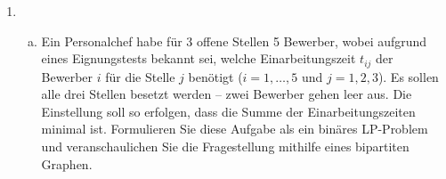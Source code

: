 \documentclass[11pt, a4paper]{article}
\begin{document}
\begin{enumerate}[\bfseries A:]
\begin{enumerate}[\bfseries 1.]
\begin{enumerate}[a)]
	\begin{center}
		\begin{pspicture}(-0.5,-1)(3.25,3)
		\footnotesize
		
		\cnode*(0,1){3pt}{V0} [180](0,1){$v_0$}
		\cnode*(1,2){3pt}{V1} [315](1,2){$v_1$}
		\cnode*(1,1){3pt}{V2} [225](1,1){$v_2$}
		\cnode*(1,0){3pt}{V3} [ 45](1,0){$v_3$}
		\cnode*(2,1){3pt}{V4} [270](2,1){$v_4$}
		\cnode*(3,0){3pt}{V5} [270](3,0){$v_5$}
		\cnode*(3,2){3pt}{V6} [ 90](3,2){$v_6$}
		
		 [135](0.5, 1.5){$3 \mid 3$}
		 [ 90](0.5, 1.0){$4 \mid 4$}
		 [225](0.5, 0.5){$4 \mid 3$}
		 [270](2, -0.5){$4 \mid 3$}
		 [ 90](2,  2.5){$5 \mid 2$}
		 [  0](1.0, 1.5){$6 \mid 6$}
		 [ 90](2.0, 2.0){$1 \mid 3$}
		 [  0](1.0, 0.5){$1 \mid 6$}
		 [ 90](1.5, 1.0){$4 \mid 5$}
		 [270](2.0, 0.0){$2 \mid 5$}
		 [225](2.5, 0.5){$1 \mid 3$}
		 [135](2.5, 1.5){$7 \mid 4$}
		 [  0](3.0, 1.0){$4 \mid 2$}
		
		\normalsize
		\end{pspicture}
	\end{center}
	
	Gefragt ist nach einem kostenminimalen Fluss der Stärke 6. Formulieren Sie diese Aufgabenstellung als LP-Problem.
\end{enumerate}


\item 
\begin{enumerate}[a)]
	
	\item Ein Personalchef habe für 3 offene Stellen 5 Bewerber, wobei aufgrund eines Eignungstests bekannt sei, welche Einarbeitungszeit $t_{ij}$ der Bewerber $i$ für die Stelle $j$ benötigt ($i=1,\ldots,5$ und $j=1,2,3$). Es sollen alle drei Stellen besetzt werden -- zwei Bewerber gehen leer aus. Die Einstellung soll so erfolgen, dass die Summe der Einarbeitungszeiten minimal ist. Formulieren Sie diese Aufgabe als ein binäres LP-Problem und veranschaulichen Sie die Fragestellung mithilfe eines bipartiten Graphen.
	

\end{enumerate}
\end{enumerate}
\end{enumerate}
\end{document}
